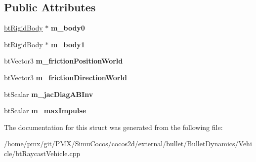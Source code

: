 \subsection*{Public Attributes}
\begin{DoxyCompactItemize}
\item 
\mbox{\label{structbtWheelContactPoint_a552bc66287fbc473742bc5f784dc7769}} 
\hyperlink{classbtRigidBody}{bt\+Rigid\+Body} $\ast$ {\bfseries m\+\_\+body0}
\item 
\mbox{\label{structbtWheelContactPoint_a65f70ab5c71e46880e41f2775104519f}} 
\hyperlink{classbtRigidBody}{bt\+Rigid\+Body} $\ast$ {\bfseries m\+\_\+body1}
\item 
\mbox{\label{structbtWheelContactPoint_afdddf099aa5bf319ae685227ae6b806d}} 
bt\+Vector3 {\bfseries m\+\_\+friction\+Position\+World}
\item 
\mbox{\label{structbtWheelContactPoint_a00aa59f208fa00087e4b2570ca166c0e}} 
bt\+Vector3 {\bfseries m\+\_\+friction\+Direction\+World}
\item 
\mbox{\label{structbtWheelContactPoint_a6209038b417fef7b6544cfec44f68ba2}} 
bt\+Scalar {\bfseries m\+\_\+jac\+Diag\+A\+B\+Inv}
\item 
\mbox{\label{structbtWheelContactPoint_a6cec1cf50a9c910ae785ceb8c31b67d7}} 
bt\+Scalar {\bfseries m\+\_\+max\+Impulse}
\end{DoxyCompactItemize}


The documentation for this struct was generated from the following file\+:\begin{DoxyCompactItemize}
\item 
/home/pmx/git/\+P\+M\+X/\+Simu\+Cocos/cocos2d/external/bullet/\+Bullet\+Dynamics/\+Vehicle/bt\+Raycast\+Vehicle.\+cpp\end{DoxyCompactItemize}
